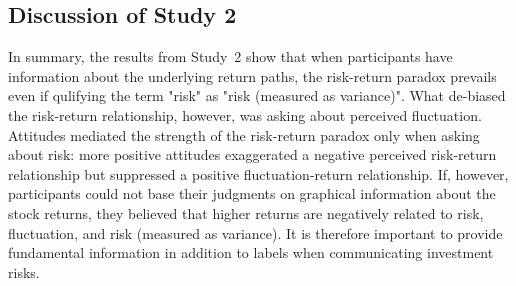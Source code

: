 \documentclass[a4paper,man, natbib,floatsintext]{apa6} %
\begin{document}

\subsection{Discussion of Study 2}
In summary, the results from Study~2 show that when participants have information about the underlying return paths, the risk-return paradox prevails even if qulifying the term "risk" as "risk (measured as variance)". What de-biased the risk-return relationship, however, was asking about perceived fluctuation. Attitudes mediated the strength of the risk-return paradox only when asking about risk: more positive attitudes exaggerated a negative perceived risk-return relationship but suppressed a positive fluctuation-return relationship. If, however, participants could not base their judgments on graphical information about the stock returns, they believed that higher returns are negatively related to risk, fluctuation, and risk (measured as variance). It is therefore important to provide fundamental information in addition to labels when communicating investment risks. 
\end{document}
